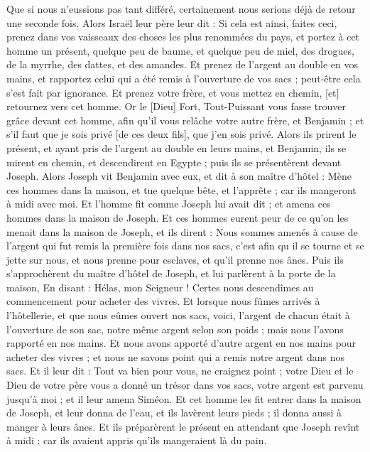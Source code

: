 \begin{multicols}{2}
Que si nous n'eussions pas tant différé, certainement nous serions déjà de retour une seconde fois.
Alors Israël leur père leur dit : Si cela est ainsi, faites ceci, prenez dans vos vaisseaux des choses les plus renommées du pays, et portez à cet homme un présent, quelque peu de baume, et quelque peu de miel, des drogues, de la myrrhe, des dattes, et des amandes.
Et prenez de l'argent au double en vos mains, et rapportez celui qui a été remis à l'ouverture de vos sacs ; peut-être cela s'est fait par ignorance.
Et prenez votre frère, et vous mettez en chemin, [et] retournez vers cet homme.
Or le [Dieu] Fort, Tout-Puissant vous fasse trouver grâce devant cet homme, afin qu'il vous relâche votre autre frère, et Benjamin ; et s'il faut que je sois privé [de ces deux fils], que j'en sois privé.
Alors ils prirent le présent, et ayant pris de l'argent au double en leurs mains, et Benjamin, ils se mirent en chemin, et descendirent en Egypte ; puis ils se présentèrent devant Joseph.
Alors Joseph vit Benjamin avec eux, et dit à son maître d'hôtel : Mène ces hommes dans la maison, et tue quelque bête, et l'apprête ; car ils mangeront à midi avec moi.
Et l'homme fit comme Joseph lui avait dit ; et amena ces hommes dans la maison de Joseph.
Et ces hommes eurent peur de ce qu'on les menait dans la maison de Joseph, et ils dirent : Nous sommes amenés à cause de l'argent qui fut remis la première fois dans nos sacs, c'est afin qu il se tourne et se jette sur nous, et nous prenne pour esclaves, et qu'il prenne nos ânes.
Puis ils s'approchèrent du maître d'hôtel de Joseph, et lui parlèrent à la porte de la maison,
En disant : Hélas, mon Seigneur ! Certes nous descendîmes au commencement pour acheter des vivres.
Et lorsque nous fûmes arrivés à l'hôtellerie, et que nous eûmes ouvert nos sacs, voici, l'argent de chacun était à l'ouverture de son sac, notre même argent selon son poids ; mais nous l'avons rapporté en nos mains.
Et nous avons apporté d'autre argent en nos mains pour acheter des vivres ; et nous ne savons point qui a remis notre argent dans nos sacs.
Et il leur dit : Tout va bien pour vous, ne craignez point ; votre Dieu et le Dieu de votre père vous a donné un trésor dans vos sacs, votre argent est parvenu jusqu'à moi ; et il leur amena Siméon.
Et cet homme les fit entrer dans la maison de Joseph, et leur donna de l'eau, et ils lavèrent leurs pieds ; il donna aussi à manger à leurs ânes.
Et ils préparèrent le présent en attendant que Joseph revînt à midi ; car ils avaient appris qu'ils mangeraient là du pain.

\end{multicols}
